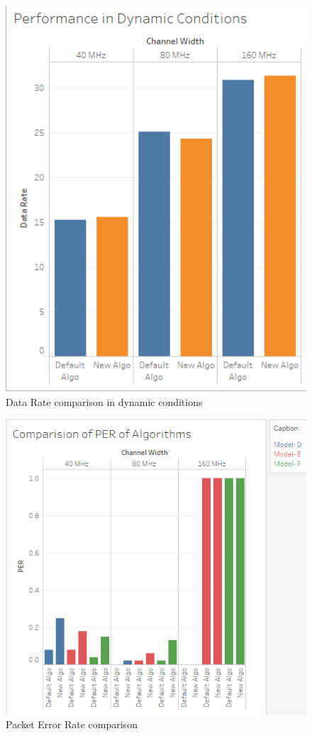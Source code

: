 \documentclass[a4paper, 10pt, conference]{ieeeconf}
\begin{document}
\begin{figure}[h]
      	\centering
     	\includegraphics[scale=0.55]{DynamicConditions.png}
      	\caption{Data Rate comparison in dynamic conditions}
      	\label{Fig. 3}
\end{figure}

\begin{figure}[h]
      	\centering
     	\includegraphics[scale=0.55]{PERAlgoComparision.png}
      	\caption{Packet Error Rate comparison}
      	\label{Fig. 4}
\end{figure}
\end{document}
